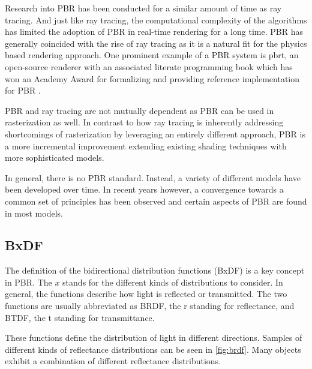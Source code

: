 Research into \gls{PBR} has been conducted for a similar amount of time as ray tracing. And just like ray tracing, the computational complexity of the algorithms has limited the adoption of \gls{PBR} in real-time rendering for a long time. \gls{PBR} has generally coincided with the rise of ray tracing as it is a natural fit for the physics based rendering approach. One prominent example of a PBR system is \gls{pbrt}, an open-source renderer with an associated literate programming book which has won an Academy Award for formalizing and providing reference implementation for \gls{PBR} \cite{Pharr_Physically_Based_Rendering_2023}.

\gls{PBR} and ray tracing are not mutually dependent as \gls{PBR} can be used in rasterization as well. In contrast to how ray tracing is inherently addressing shortcomings of rasterization by leveraging an entirely different approach, \gls{PBR} is a more incremental improvement extending existing shading techniques with more sophisticated models.

In general, there is no \gls{PBR} standard. Instead, a variety of different models have been developed over time. In recent years however, a convergence towards a common set of principles has been observed and certain aspects of \gls{PBR} are found in most models.

\subsection{BxDF}

The definition of the bidirectional distribution functions (BxDF) is a key concept in PBR. The $x$ stands for the different kinds of distributions to consider. In general, the functions describe how light is reflected or transmitted. The two functions are usually abbreviated as BRDF, the r standing for reflectance, and BTDF, the t standing for transmittance.

These functions define the distribution of light in different directions. Samples of different kinds of reflectance distributions can be seen in \autoref{fig:brdf}. Many objects exhibit a combination of different reflectance distributions.

